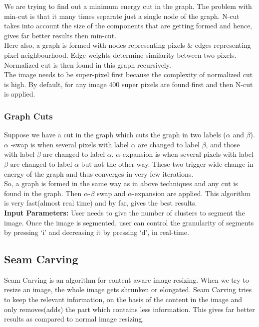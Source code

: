 \documentclass[12pt]{article}
\begin{document}
 We are trying to find out a minimum energy cut in the graph. The problem with min-cut is that it many times separate just a single node of the graph. N-cut takes into account the size of the components that are getting formed and hence, gives far better results then min-cut.\\
 
 Here also, a graph is formed with nodes representing pixels \& edges representing pixel neighbourhood. Edge weights determine similarity between two pixels. Normalized cut is then found in this graph recursively.\\
 
 The image needs to be super-pixel first because the complexity of normalized cut is high. By default, for any image 400 super pixels are found first and then N-cut is applied.\\



\subsubsection{Graph Cuts}

Suppose we have a cut in the graph which cuts the graph in two labels ($\alpha$ and $\beta$). $\alpha$ -swap is when several pixels with label $\alpha$ are changed to label $\beta$, and those with label $\beta$ are changed to label $\alpha$. $\alpha$-expansion is when several pixels with label $\beta$ are changed to label $\alpha$ but not the other way. These two trigger wide change in energy of the graph and thus converges in very few iterations.\\

So, a graph is formed in the same way as in above techniques and any cut is found in the graph. Then $\alpha$-$\beta$ swap and $\alpha$-expansion are applied. This algorithm is very fast(almost real time) and by far, gives the best results.\\

\textbf{Input Parameters:} User needs to give the number of clusters to segment the image. Once the image is segmented, user can control the granularity of segments by pressing `i' and decreasing it by pressing `d', in real-time.\\


\subsection{Seam Carving}

Seam Carving is an algorithm for content aware image resizing. When we try to resize an image, the whole image gets shrunken or elongated. Seam Carving tries to keep the relevant information, on the basis of the content in the image and only removes(adds) the part which contains less information. This gives far better results as compared to normal image resizing.\\
\end{document}

